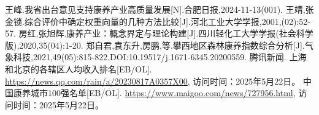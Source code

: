 \documentclass[12pt,a4paper]{article}
\begin{document}
\newpage
\begin{thebibliography}{99}
         王峰.我省出台意见支持康养产业高质量发展[N].合肥日报,2024-11-13(001).
         王靖,张金锁.综合评价中确定权重向量的几种方法比较[J].河北工业大学学报,2001,(02):52-57.
         房红,张旭辉.康养产业：概念界定与理论构建[J].四川轻化工大学学报(社会科学版),2020,35(04):1-20.
         郑自君,袁东升,房鹏,等.攀西地区森林康养指数综合分析[J].气象科技,2021,49(05):815-822.DOI:10.19517/j.1671-6345.20200559.
         腾讯新闻. 上海和北京的各辖区人均收入排名[EB/OL]. \url{https://news.qq.com/rain/a/20230817A0357X00}, 访问时间：2025年5月22日。
         中国康养城市100强名单[EB/OL]. \url{https://www.maigoo.com/news/727956.html}, 访问时间：2025年5月22日。
\end{thebibliography}
\end{document}

